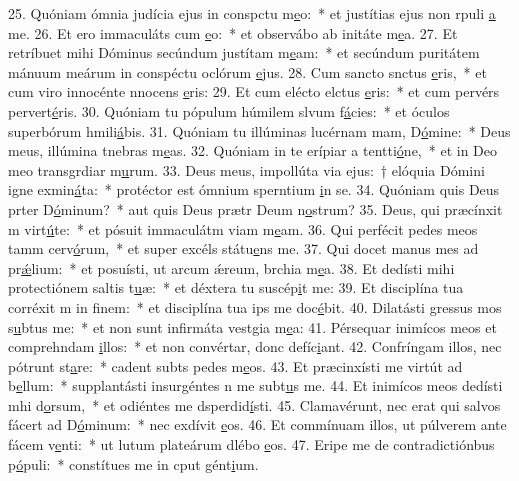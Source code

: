 25. Quóniam ómnia judícia ejus in conspctu m\uline{e}o:~* et justítias ejus non rpuli \uline{a} me.
26. Et ero immaculáts cum \uline{e}o:~* et observábo ab initáte m\uline{e}a.
27. Et retríbuet mihi Dóminus secúndum justítam m\uline{e}am:~* et secúndum puritátem mánuum meárum in conspéctu oclórum \uline{e}jus.
28. Cum sancto snctus \uline{e}ris,~* et cum viro innocénte nnocens \uline{e}ris:
29. Et cum elécto elctus \uline{e}ris:~* et cum pervérs pervert\uline{é}ris.
30. Quóniam tu pópulum húmilem slvum f\uline{á}cies:~* et óculos superbórum hmili\uline{á}bis.
31. Quóniam tu illúminas lucérnam mam, D\uline{ó}mine:~* Deus meus, illúmina tnebras m\uline{e}as.
32. Quóniam in te erípiar a tentti\uline{ó}ne,~* et in Deo meo transgrdiar m\uline{u}rum.
33. Deus meus, impollúta via ejus:~† elóquia Dómini igne exmin\uline{á}ta:~* protéctor est ómnium sperntium \uline{i}n se.
34. Quóniam quis Deus prter D\uline{ó}minum?~* aut quis Deus prætr Deum n\uline{o}strum?
35. Deus, qui præcínxit m virt\uline{ú}te:~* et pósuit immaculátm viam m\uline{e}am.
36. Qui perfécit pedes meos tamm cerv\uline{ó}rum,~* et super excéls státu\uline{e}ns me.
37. Qui docet manus mes ad pr\uline{ǽ}lium:~* et posuísti, ut arcum ǽreum, brchia m\uline{e}a.
38. Et dedísti mihi protectiónem saltis t\uline{u}æ:~* et déxtera tu suscép\uline{i}t me:
39. Et disciplína tua corréxit m in f\uline{i}nem:~* et disciplína tua ips me doc\uline{é}bit.
40. Dilatásti gressus mos s\uline{u}btus me:~* et non sunt infirmáta vestgia m\uline{e}a:
41. Pérsequar inimícos meos et comprehndam \uline{i}llos:~* et non convértar, donc defíc\uline{i}ant.
42. Confríngam illos, nec pótrunt st\uline{a}re:~* cadent subts pedes m\uline{e}os.
43. Et præcinxísti me virtút ad b\uline{e}llum:~* supplantásti insurgéntes n me subt\uline{u}s me.
44. Et inimícos meos dedísti mhi d\uline{o}rsum,~* et odiéntes me dsperdid\uline{í}sti.
45. Clamavérunt, nec erat qui salvos fácert ad D\uline{ó}minum:~* nec exdívit \uline{e}os.
46. Et commínuam illos, ut púlverem ante fácem v\uline{e}nti:~* ut lutum plateárum dlébo \uline{e}os.
47. Eripe me de contradictiónbus p\uline{ó}puli:~* constítues me in cput gént\uline{i}um.
